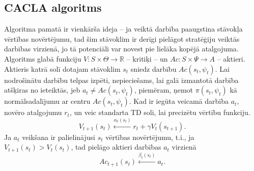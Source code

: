 \documentclass[a0,landscape]{a0poster}
\numberwithin{equation}{section}
\theoremstyle{definition}
\theoremstyle{plain}
\begin{document}
\begin{multicols}{5}
\subsection*{CACLA algoritms}
Algoritma pamatā ir vienkārša ideja -- ja veiktā darbība paaugstina stāvokļa vērtības novērtējumu, tad šim stāvoklim ir derīgi pielāgot stratēģiju veiktās darbības virzienā, jo tā potenciāli var novest pie lielāka kopējā atalgojuma.
Algoritms glabā funkciju $V:S \times \Theta \rightarrow \mathbb{R}$ -- kritiķi -- un $Ac : S \times \Psi \rightarrow A$ -- aktieri.
Aktieris katrā solī dotajam stāvoklim $s_t$ sniedz darbību $Ac(s_t, \psi_t)$.
Lai nodrošinātu darbību telpas izpēti, nepieciešams, lai galā izmantotā darbība atšķiras no ieteiktās, jeb $a_t \neq Ac(s_t, \psi_t)$, piemēram, ņemot $\pi(s_t, \psi_t)$ kā normālsadalījumu ar centru $Ac(s_t, \psi_t)$.
Kad ir iegūta veicamā darbība $a_t$, novēro atalgojumu $r_t$, un veic standarta TD soli, lai precizētu vērtību funkciju.
\[
	V_{t+1}(s_t) \xleftarrow{\alpha_t(s_t)} r_t + \gamma V_t(s_{t + 1}).
\]
Ja $a_t$ veikšana ir palielinājusi $s_t$ vērtības novērtējumu, t.i., ja $V_{t+1}(s_t) > V_t(s_t)$, tad pielāgo aktieri darbības $a_t$ virzienā
\[
	Ac_{t+1}(s_t) \xleftarrow{\beta_t(s_t)} a_t.
\]

\end{multicols}
\end{document}
